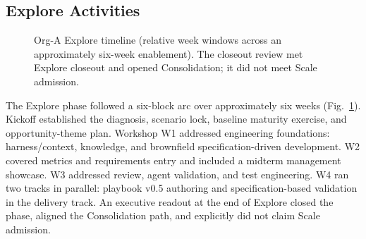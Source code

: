 \documentclass[10pt,conference]{IEEEtran}
\begin{document}
\subsection{Explore Activities}

\begin{figure}[t]
\centering
{}
\caption{Org-A Explore timeline (relative week windows across an approximately
six-week enablement).  The closeout review met Explore closeout and opened
Consolidation; it did not meet Scale admission.}
\label{fig:org-a-timeline}
\end{figure}

The Explore phase followed a six-block arc over approximately six weeks
(Fig.~\ref{fig:org-a-timeline}).
Kickoff established the diagnosis, scenario lock, baseline maturity
exercise, and opportunity-theme plan.  Workshop W1 addressed
engineering foundations: harness/context, knowledge, and brownfield
specification-driven development.  W2 covered metrics and
requirements entry and included a midterm management showcase.  W3
addressed review, agent validation, and test engineering.
W4 ran two tracks in parallel: playbook v0.5 authoring and
specification-based validation in the delivery track.  An executive
readout at the end of Explore closed the phase, aligned the Consolidation
path, and explicitly did not claim Scale admission.
\end{document}
